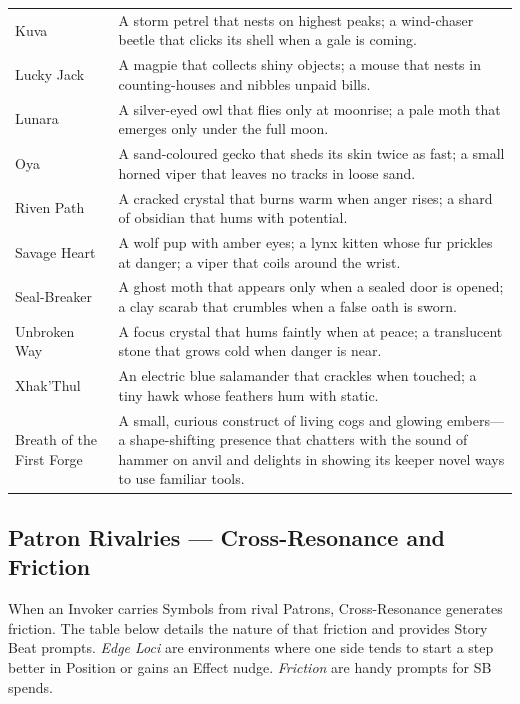 \begin{longtable}{@{}p{4.2cm}p{9.4cm}@{}}
  Kuva & A storm petrel that nests on highest peaks; a wind-chaser beetle that clicks its shell when a gale is coming. \\
  Lucky Jack & A magpie that collects shiny objects; a mouse that nests in counting-houses and nibbles unpaid bills. \\
  Lunara & A silver-eyed owl that flies only at moonrise; a pale moth that emerges only under the full moon. \\
  Oya & A sand-coloured gecko that sheds its skin twice as fast; a small horned viper that leaves no tracks in loose sand. \\
  Riven Path & A cracked crystal that burns warm when anger rises; a shard of obsidian that hums with potential. \\
  Savage Heart & A wolf pup with amber eyes; a lynx kitten whose fur prickles at danger; a viper that coils around the wrist. \\
  Seal-Breaker & A ghost moth that appears only when a sealed door is opened; a clay scarab that crumbles when a false oath is sworn. \\
  Unbroken Way & A focus crystal that hums faintly when at peace; a translucent stone that grows cold when danger is near. \\
  Xhak'Thul & An electric blue salamander that crackles when touched; a tiny hawk whose feathers hum with static. \\
  Breath of the First Forge & A small, curious construct of living cogs and glowing embers---a shape-shifting presence that chatters with the sound of hammer on anvil and delights in showing its keeper novel ways to use familiar tools. \\
\end{longtable}

\clearpage

\subsection{Patron Rivalries --- Cross-Resonance and Friction}
\label{subsec:rivalry-table}

When an Invoker carries Symbols from rival Patrons, Cross-Resonance generates friction. The table below details the nature of that friction and provides Story Beat prompts. \emph{Edge Loci} are environments where one side tends to start a step better in Position or gains an Effect nudge. \emph{Friction} are handy prompts for SB spends.

\renewcommand{\arraystretch}{1.15}
\setlength{\LTpre}{0pt}
\setlength{\LTpost}{0pt}

